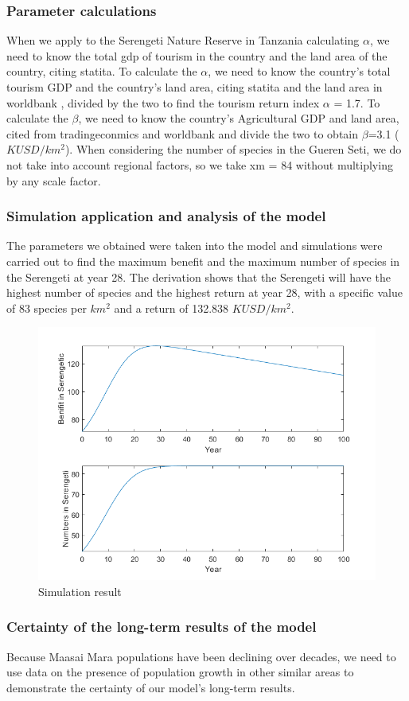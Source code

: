 \documentclass{mcmthesis}
\numberwithin{figure}{section}
\numberwithin{table}{section}
\numberwithin{equation}{section}
\begin{document}
\subsubsection{Parameter calculations}
When we apply to the Serengeti Nature Reserve in Tanzania
calculating $\alpha$, we need to know the total gdp of tourism in the country and the land area of the country, citing statita. \cite{6}
To calculate the $\alpha$, we need to know the country's total tourism GDP and the country's land area, citing statita \cite{7} and the land area in worldbank \cite{7}, divided by the two to find the tourism return index $\alpha$ = 1.7. To calculate the $\beta$, we need to know the country's Agricultural GDP and land area, cited from tradingeconmics \cite{8} and worldbank \cite{9} and divide the two to obtain $\beta$=3.1 ($KUSD/km^2$). When considering the number of species in the Gueren Seti, we do not take into account regional factors, so we take xm = 84 without multiplying by any scale factor.

\subsubsection{Simulation application and analysis of the model}
The parameters we obtained were taken into the model and simulations were carried out to find the maximum benefit and the maximum number of species in the Serengeti at year 28. The derivation shows that the Serengeti will have the highest number of species and the highest return at year 28, with a specific value of 83 species per $km^2$ and a return of 132.838 $KUSD/km^2$.

\begin{figure}
	\centering
	\includegraphics[width=0.5\linewidth]{./figures/Q3.png}
	\caption{Simulation result}
	\label{F 7.2}
\end{figure}


\subsubsection{Certainty of the long-term results of the model}
Because Maasai Mara populations have been declining over decades, we need to use data on the presence of population growth in other similar areas to demonstrate the certainty of our model's long-term results. 
\end{document}
